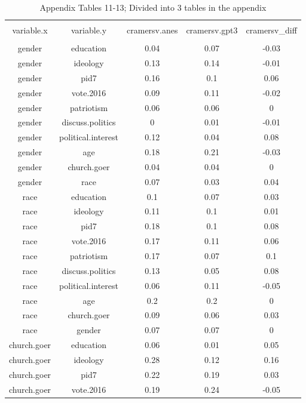 
\begin{longtable}{@{\extracolsep{5pt}} ccccc} 
  \caption{Appendix Tables 11-13; Divided into 3 tables in the appendix} 
  \label{tab:cramersvresults} 
\\[-1.8ex]\hline \\[-1.8ex] 
variable.x & variable.y & cramersv.anes & cramersv.gpt3 & cramersv\_diff \\ 
\endhead
\hline \\[-1.8ex] 
gender & education & 0.04 & 0.07 & -0.03 \\ 
gender & ideology & 0.13 & 0.14 & -0.01 \\ 
gender & pid7 & 0.16 & 0.1 & 0.06 \\ 
gender & vote.2016 & 0.09 & 0.11 & -0.02 \\ 
gender & patriotism & 0.06 & 0.06 & 0 \\ 
gender & discuss.politics & 0 & 0.01 & -0.01 \\ 
gender & political.interest & 0.12 & 0.04 & 0.08 \\ 
gender & age & 0.18 & 0.21 & -0.03 \\ 
gender & church.goer & 0.04 & 0.04 & 0 \\ 
gender & race & 0.07 & 0.03 & 0.04 \\ 
race & education & 0.1 & 0.07 & 0.03 \\ 
race & ideology & 0.11 & 0.1 & 0.01 \\ 
race & pid7 & 0.18 & 0.1 & 0.08 \\ 
race & vote.2016 & 0.17 & 0.11 & 0.06 \\ 
race & patriotism & 0.17 & 0.07 & 0.1 \\ 
race & discuss.politics & 0.13 & 0.05 & 0.08 \\ 
race & political.interest & 0.06 & 0.11 & -0.05 \\ 
race & age & 0.2 & 0.2 & 0 \\ 
race & church.goer & 0.09 & 0.06 & 0.03 \\ 
race & gender & 0.07 & 0.07 & 0 \\ 
church.goer & education & 0.06 & 0.01 & 0.05 \\ 
church.goer & ideology & 0.28 & 0.12 & 0.16 \\ 
church.goer & pid7 & 0.22 & 0.19 & 0.03 \\ 
church.goer & vote.2016 & 0.19 & 0.24 & -0.05 \\ 

\end{longtable}

